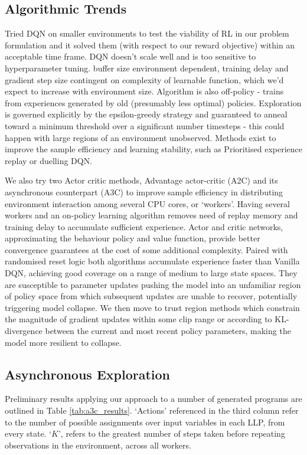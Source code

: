 \documentclass[conference,compsoc]{IEEEtran}
\begin{document}
\subsection{Algorithmic Trends}\label{sec:algorithmic_trends}
Tried DQN on smaller environments to test the viability of RL in our problem formulation and it solved them (with respect to our reward objective) within an acceptable time frame. 
DQN doesn't scale well and is too sensitive to hyperparameter tuning. buffer size environment dependent, training delay and gradient step size contingent on complexity of learnable function, which we'd expect to increase with environment size. Algorithm is also off-policy - trains from experiences generated by old (presumably less optimal) policies. Exploration is governed explicitly by the epsilon-greedy strategy and guaranteed to anneal toward a minimum threshold over a significant number timesteps - this could happen with large regions of an environment unobserved. Methods exist to improve the sample efficiency and learning stability, such as Prioritised experience replay or duelling DQN.

We also try two Actor critic methods, Advantage actor-critic (A2C) and its asynchronous counterpart (A3C) to improve sample efficiency in distributing environment interaction among several CPU cores, or `workers'. Having several workers and an on-policy learning algorithm removes need of replay memory and training delay to accumulate sufficient experience. Actor and critic networks, approximating the behaviour policy and value function, provide better convergence guarantees at the cost of some additional complexity. Paired with randomised reset logic both algorithms accumulate experience faster than Vanilla DQN, achieving good coverage on a range of medium to large state spaces. They are susceptible to parameter updates pushing the model into an unfamiliar region of policy space from which subsequent updates are unable to recover, potentially triggering model collapse.
We then move to trust region methods which constrain the magnitude of gradient updates within some clip range or according to KL-divergence between the current and most recent policy parameters, making the model more resilient to collapse.

\subsection{Asynchronous Exploration}
Preliminary results applying our approach to a number of generated programs are outlined in Table \ref{tab:a3c_results}. `Actions' referenced in the third column refer to the number of possible assignments over input variables in each LLP, from every state. `$K$', refers to the greatest number of steps taken before repeating observations in the environment, across all workers.
\end{document}
